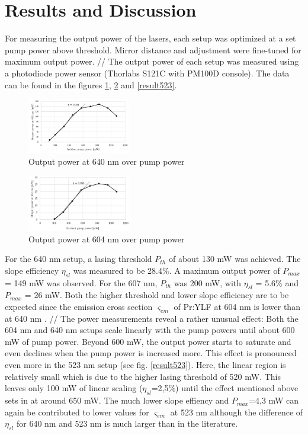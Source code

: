 \documentclass[conference]{IEEEtran}
\begin{document}
\section{Results and Discussion}
For measuring the output power of the lasers, each setup was optimized at a set pump power above threshold. Mirror distance and adjustment were fine-tuned for maximum output power. //
The output power of each setup was measured using a photodiode power sensor (Thorlabs S121C with PM100D console). The data can be found in the figures \ref{result640}, \ref{result604} and \ref{result523}.
 \begin{figure}[h]
	\centering
	\includegraphics[width=0.4\textwidth]{img/measurement640}
	\caption{Output power at 640 nm over pump power}
	\label{result640}
\end{figure}
 \begin{figure}[h]
	\centering
	\includegraphics[width=0.4\textwidth]{img/measurement604}
	\caption{Output power at 604 nm over pump power}
	\label{result604}
\end{figure}
For the 640 nm setup, a lasing threshold $P_{th}$ of about 130 mW was achieved. The slope efficiency $\eta_{sl}$ was measured to be 28.4\%. A maximum output power of $P_{max}$ = 149 mW was observed. For the 607 nm, $P_{th}$ was 200 mW, with $\eta_{sl}$ = 5.6\% and $P_{max}$ = 26 mW. Both the higher threshold and lower slope efficiency are to be expected since the emission cross section $\varsigma_{em}$ of Pr:YLF at 604 nm is lower than at 640 nm \cite{Richter.2007}. //
The power measurements reveal a rather unusual effect: Both the 604 nm and 640 nm setups scale linearly with the pump powers until about 600 mW of pump power. Beyond 600 mW, the output power starts to saturate and even declines when the pump power is increased more. This effect is pronounced even more in the 523 nm setup (see fig. \ref{result523}). Here, the linear region is relatively small which is due to the higher lasing threshold of 520 mW. This leaves only 100 mW of linear scaling ($\eta_{sl}$=2,5\%) until the effect mentioned above sets in at around 650 mW. The much lower slope effiency and $P_{max}$=4,3 mW can again be contributed to lower values for $\varsigma_{em}$ at 523 nm  although the difference of $\eta_{sl}$ for 640 nm and 523 nm is much larger than in the literature\cite{Richter.2007}.
\end{document}
